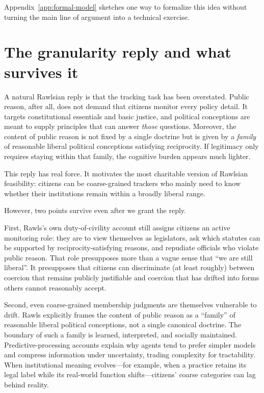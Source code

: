 \documentclass[12pt]{report}
\begin{document}
Appendix~\ref{app:formal-model} sketches one way to formalize this idea without turning the main line of argument into a technical exercise.

\section{The granularity reply and what survives it}
\label{sec:granularity-reply}

A natural Rawlsian reply is that the tracking task has been overstated. Public reason, after all, does not demand that citizens monitor every policy detail. It targets constitutional essentials and basic justice, and political conceptions are meant to supply principles that can answer \emph{those} questions. \parencite[pp.~453--454]{rawls2005political} Moreover, the content of public reason is not fixed by a single doctrine but is given by a \emph{family} of reasonable liberal political conceptions satisfying reciprocity. \parencite[p.~485]{rawls2005political} If legitimacy only requires staying within that family, the cognitive burden appears much lighter.

This reply has real force. It motivates the most charitable version of Rawlsian feasibility: citizens can be coarse-grained trackers who mainly need to know whether their institutions remain within a broadly liberal range.

However, two points survive even after we grant the reply.

First, Rawls's own duty-of-civility account still assigns citizens an active monitoring role: they are to view themselves as legislators, ask which statutes can be supported by reciprocity-satisfying reasons, and repudiate officials who violate public reason. \parencite[p.~444]{rawls2005political} That role presupposes more than a vague sense that \enquote{we are still liberal}. It presupposes that citizens can discriminate (at least roughly) between coercion that remains publicly justifiable and coercion that has drifted into forms others cannot reasonably accept.

Second, even coarse-grained membership judgments are themselves vulnerable to drift. Rawls explicitly frames the content of public reason as a \enquote{family} of reasonable liberal political conceptions, not a single canonical doctrine.\parencite[p.~450]{rawls2005political} The boundary of such a family is learned, interpreted, and socially maintained. Predictive-processing accounts explain why agents tend to prefer simpler models and compress information under uncertainty, trading complexity for tractability.\parencite[p.~128]{friston2010freeenergy}\parencite[pp.~491--492]{ganguli2012compressed} When institutional meaning evolves---for example, when a practice retains its legal label while its real-world function shifts---citizens' coarse categories can lag behind reality.
\end{document}

